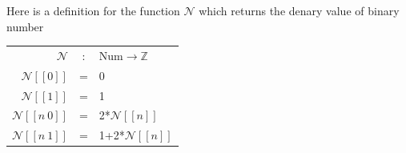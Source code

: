 \documentclass[11pt,a4paper]{article}
\begin{document}
Here is a definition for the function $\mathcal{N}$ which returns the denary value of binary number\\
\begin{tabular}{rcl}
$\mathcal{N}$&:&Num$\to\mathbb{Z}$\\
$\mathcal{N}[[0]]$&=&0\\
$\mathcal{N}[[1]]$&=&1\\
$\mathcal{N}[[n\ 0]]$&=&2*$\mathcal{N}[[n]]$\\
$\mathcal{N}[[n\ 1]]$&=&1+2*$\mathcal{N}[[n]]$
\end{tabular}
\end{document}
